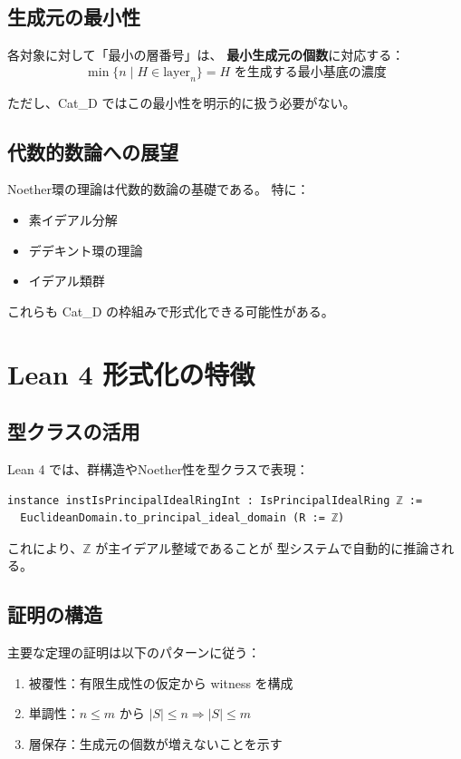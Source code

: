 \documentclass[a4paper,12pt]{ltjsarticle}
\theoremstyle{definition}
\begin{document}
\subsection{生成元の最小性}

各対象に対して「最小の層番号」は、
\textbf{最小生成元の個数}に対応する：
\[
\min\{n \mid H \in \text{layer}_n\} =
\text{$H$ を生成する最小基底の濃度}
\]

ただし、Cat\_D ではこの最小性を明示的に扱う必要がない。

\subsection{代数的数論への展望}

Noether環の理論は代数的数論の基礎である。
特に：
\begin{itemize}
  \item 素イデアル分解
  \item デデキント環の理論
  \item イデアル類群
\end{itemize}
これらも Cat\_D の枠組みで形式化できる可能性がある。

\section{Lean 4 形式化の特徴}

\subsection{型クラスの活用}

Lean 4 では、群構造やNoether性を型クラスで表現：
\begin{verbatim}
instance instIsPrincipalIdealRingInt : IsPrincipalIdealRing ℤ :=
  EuclideanDomain.to_principal_ideal_domain (R := ℤ)
\end{verbatim}

これにより、$\mathbb{Z}$ が主イデアル整域であることが
型システムで自動的に推論される。

\subsection{証明の構造}

主要な定理の証明は以下のパターンに従う：
\begin{enumerate}
  \item 被覆性：有限生成性の仮定から witness を構成
  \item 単調性：$n \leq m$ から $|S| \leq n \Rightarrow |S| \leq m$
  \item 層保存：生成元の個数が増えないことを示す
\end{enumerate}
\end{document}
